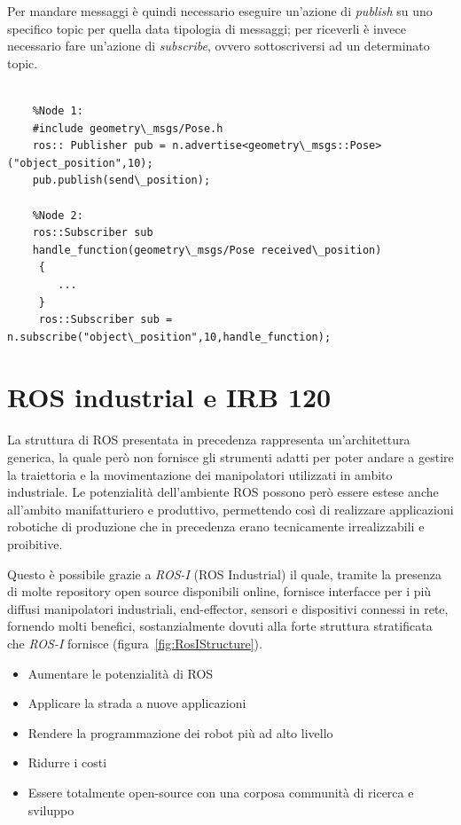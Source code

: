 Per mandare messaggi è quindi necessario eseguire un'azione di \emph{publish} su uno specifico topic per quella data tipologia di messaggi; per riceverli è invece necessario fare un'azione di \emph{subscribe}, ovvero sottoscriversi ad un determinato topic.
\begin{lstlisting}[style=Matlab-editor,caption=Semplice esempio di comunicazione publish-subscribe,captionpos=b,label={Code:pubsub-example}, basicstyle=\scriptsize\ttfamily,frame=trBL]

	%Node 1:
	#include geometry\_msgs/Pose.h
	ros:: Publisher pub = n.advertise<geometry\_msgs::Pose>("object_position",10);
	pub.publish(send\_position);
	
	%Node 2:
	ros::Subscriber sub
	handle_function(geometry\_msgs/Pose received\_position)
	 {
	 	...
	 }
	 ros::Subscriber sub = n.subscribe("object\_position",10,handle_function);
\end{lstlisting}


\section{ROS industrial e IRB 120}
La struttura di ROS presentata in precedenza rappresenta un'architettura generica, la quale però non fornisce gli strumenti adatti per poter andare a gestire la traiettoria e la movimentazione dei manipolatori utilizzati in ambito industriale. Le potenzialità dell'ambiente ROS possono però essere estese anche all'ambito manifatturiero e produttivo, permettendo così di realizzare applicazioni robotiche di produzione che in precedenza erano tecnicamente irrealizzabili e proibitive.

Questo è possibile grazie a \emph{ROS-I} (ROS Industrial) il quale, tramite la presenza di molte repository open source disponibili online, fornisce interfacce per i più diffusi manipolatori industriali, end-effector, sensori e dispositivi connessi in rete, fornendo molti benefici, sostanzialmente dovuti alla forte struttura stratificata che \emph{ROS-I} fornisce (figura~\vref{fig:RosIStructure}).
\begin{itemize}
	\item Aumentare le potenzialità di ROS
	\item Applicare la strada a nuove applicazioni
	\item Rendere la programmazione dei robot più ad alto livello
	\item Ridurre i costi
	\item Essere totalmente open-source con una corposa communità di ricerca e sviluppo 
\end{itemize}

